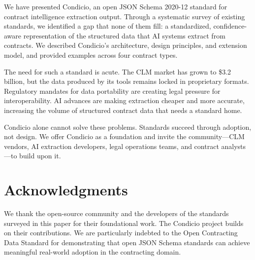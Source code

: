 \documentclass[11pt,a4paper]{article}
\begin{document}
We have presented Condicio, an open JSON Schema 2020-12 standard for contract intelligence extraction output. Through a systematic survey of existing standards, we identified a gap that none of them fill: a standardized, confidence-aware representation of the structured data that AI systems extract from contracts. We described Condicio's architecture, design principles, and extension model, and provided examples across four contract types.

The need for such a standard is acute. The CLM market has grown to \$3.2 billion, but the data produced by its tools remains locked in proprietary formats. Regulatory mandates for data portability are creating legal pressure for interoperability. AI advances are making extraction cheaper and more accurate, increasing the volume of structured contract data that needs a standard home.

Condicio alone cannot solve these problems. Standards succeed through adoption, not design. We offer Condicio as a foundation and invite the community---CLM vendors, AI extraction developers, legal operations teams, and contract analysts---to build upon it.

\section*{Acknowledgments}

We thank the open-source community and the developers of the standards surveyed in this paper for their foundational work. The Condicio project builds on their contributions. We are particularly indebted to the Open Contracting Data Standard for demonstrating that open JSON Schema standards can achieve meaningful real-world adoption in the contracting domain.
\end{document}
